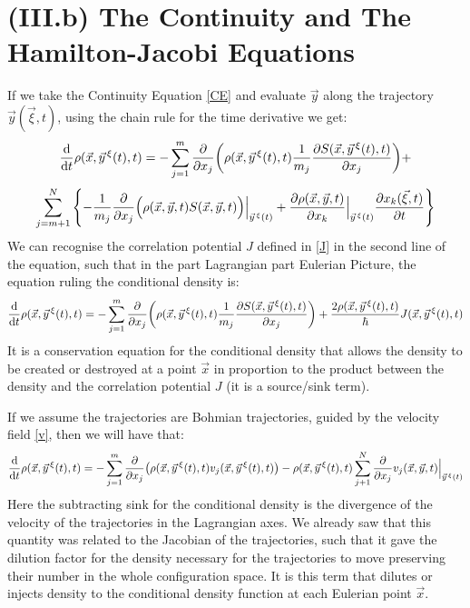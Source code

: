 \documentclass[11pt, a4paper]{article} %
\begin{document}
\section*{(III.b) The Continuity and The Hamilton-Jacobi Equations}
If we take the Continuity Equation \eqref{CE} and evaluate $\vec{y}$ along the trajectory $\vec{y}(\vec{\xi},t)$, using the chain rule for the time derivative we get:
\begin{equation}
\dv{}{t}\rho(\vec{x},\vec{y}^{\, \xi}(t),t)=-\sum_{j=1}^m\pdv{}{x_j}\qty(\rho(\vec{x}, \vec{y}^{\, \xi}(t), t) \frac{1}{m_j}\pdv{S(\vec{x}, \vec{y}^{\, \xi}(t), t)}{x_j}) + 
\end{equation}
$$
\sum_{j=m+1}^N\qty{ -\frac{1}{m_j}\pdv{}{x_j}\Big(\rho(\vec{x},\vec{y},t)S(\vec{x}, \vec{y}, t)\Big)\Big\rvert_{\vec{y}^{\, \xi}(t)}+\pdv{\rho(\vec{x}, \vec{y}, t)}{x_k}\Big\rvert_{\vec{y}^{\, \xi}(t)} \pdv{x_k(\vec{\xi},t)}{t}}
$$
We can recognise the correlation potential $J$ defined in \eqref{J} in the second line of the equation, such that in the part Lagrangian part Eulerian Picture, the equation ruling the conditional density is:
\begin{equation}\label{CE.EL}
\dv{}{t}\rho(\vec{x},\vec{y}^{\, \xi}(t),t)=-\sum_{j=1}^m\pdv{}{x_j}\qty(\rho(\vec{x}, \vec{y}^{\, \xi}(t), t) \frac{1}{m_j}\pdv{S(\vec{x}, \vec{y}^{\, \xi}(t), t)}{x_j}) + \frac{2\rho(\vec{x},\vec{y}^{\, \xi}(t),t)}{\hbar}J(\vec{x},\vec{y}^{\, \xi}(t),t)
\end{equation}
It is a conservation equation for the conditional density that allows the density to be created or destroyed at a point $\vec{x}$ in proportion to the product between the density and the correlation potential $J$ (it is a source/sink term).

If we assume the trajectories are Bohmian trajectories, guided by the velocity field \eqref{v}, then we will have that:
\begin{equation}\label{CE.EL.Bohm}
\dv{}{t}\rho(\vec{x},\vec{y}^{\, \xi}(t),t)=-\sum_{j=1}^m\pdv{}{x_j}\qty(\rho(\vec{x}, \vec{y}^{\, \xi}(t), t) v_j(\vec{x}, \vec{y}^{\, \xi}(t),t)) - \rho(\vec{x},\vec{y}^{\, \xi}(t),t)\sum_{j+1}^N \pdv{}{x_j}v_j(\vec{x}, \vec{y},t)\Big\rvert_{\vec{y}^{\, \xi}(t)}
\end{equation}
 Here the subtracting sink for the conditional density is the divergence of the velocity of the trajectories in the Lagrangian axes. We already saw that this quantity was related to the Jacobian of the trajectories, such that it gave the dilution factor for the density necessary for the trajectories to move preserving their number in the whole configuration space. It is this term that dilutes or injects density to the conditional density function at each Eulerian point $\vec{x}$.
\end{document}
